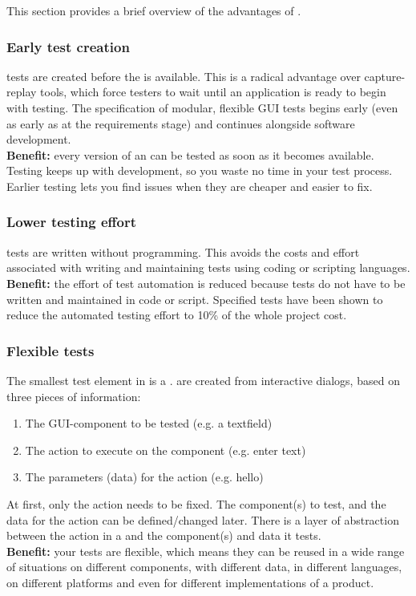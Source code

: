 This section provides a brief overview of the
advantages of \jb{}{}.


\subsubsection{Early test creation}
\jb{} tests are created before the \gdaut{} is available. This is a radical advantage over capture-replay tools, which force testers to wait until an application is ready to begin with testing. The specification of modular, flexible GUI tests begins early (even as early as at the requirements stage) and continues alongside software development.\\ 
\textbf{Benefit:} every version of an \gdaut{} can be tested as soon as it becomes available. Testing keeps up with development, so you waste no time in your test process. Earlier testing lets you find issues when they are cheaper and easier to fix.

\subsubsection{Lower testing effort}
\jb{} tests are written without programming. This avoids the costs and effort associated with writing and maintaining tests using coding or scripting languages. \\
\textbf{Benefit:} the effort of test automation is reduced because tests do not have to be written and maintained in code or script. Specified tests have been shown to reduce the automated testing effort to 10\% of the whole project cost. 
 
\subsubsection{Flexible tests}
The smallest test element in \jb{} is a \gdstep{}. \gdsteps{} are created from interactive dialogs, based on three pieces of information:
\begin{enumerate}
\item The GUI-component to be tested (e.g. a textfield)
\item The action to execute on the component (e.g. enter text)
\item The parameters (data) for the action (e.g. hello)
\end{enumerate}
At first, only the action needs to be fixed. The component(s) to test, and the data for the action can be defined/changed later. There is a layer of abstraction between the action in a \gdstep{} and the component(s) and data it tests. \\
\textbf{Benefit:} your tests are flexible, which means they can be reused in a wide range of situations  on different components, with different data, in different languages, on different platforms and even for different implementations of a product. 

